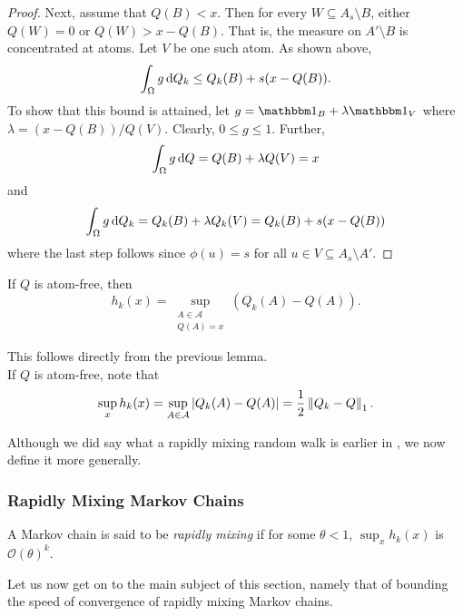 \begin{proof}
	Next, assume that $Q(B)<x$. Then for every $W\subseteq A_s\setminus B$, either $Q(W)=0$ or $Q(W)>x-Q(B)$. That is, the measure on $A'\setminus B$ is concentrated at atoms. Let $V$ be one such atom. As shown above,
	\[ \int_\Omega g\operatorname{d}\!{Q}_k \leq Q_k(B) + s(x-Q(B)). \]
	To show that this bound is attained, let $g=\indic_B+\lambda\indic_{V}$ where $\lambda = (x-Q(B))/Q(V)$. Clearly, $0\leq g\leq 1$. Further,
	\[ \int_\Omega g\operatorname{d}\!{Q} = Q(B) + \lambda Q(V) = x \]
	and
	\[ \int_\Omega g\operatorname{d}\!{Q}_k = Q_k(B)+\lambda Q_k(V) = Q_k(B) + s(x-Q(B)) \]
	where the last step follows since $\phi(u)=s$ for all $u\in V\subseteq A_s\setminus A'$.
\end{proof}

\begin{lemma}
	If $Q$ is atom-free, then
	\[ h_k(x) = \sup_{\substack{A\in\mathcal{A} \\ Q(A)=x}} \left(Q_k(A) - Q(A)\right). \]
\end{lemma}

This follows directly from the previous lemma.\\
If $Q$ is atom-free, note that
\begin{equation}
	\label{eqn: hk and one norm}
	\sup_{x} h_k(x) = \sup_{A\in\mathcal{A}} |Q_k(A) - Q(A)| = \frac{1}{2}\left\lVert Q_k - Q\right\rVert_1.
\end{equation}

Although we did say what a rapidly mixing random walk is earlier in , we now define it more generally.\\

\subsubsection{Rapidly Mixing Markov Chains}

\begin{fdef}
A Markov chain is said to be \textit{rapidly mixing} if for some $\theta<1$, $\sup_x h_k(x)$ is $\mathcal{O}(\theta)^k$.
\end{fdef}

Let us now get on to the main subject of this section, namely that of bounding the speed of convergence of rapidly mixing Markov chains.

